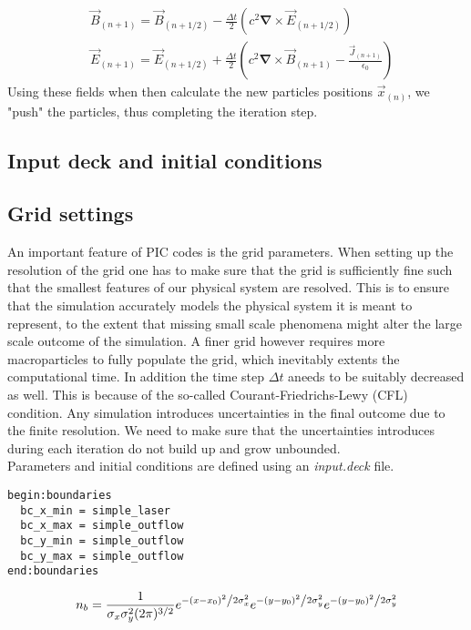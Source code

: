 \begin{align}
&\vec{B}_{(n+1)}=\vec{B}_{(n+1/2)}-\frac{\Delta t}{2}\left(c^2\mathbf{\nabla}\times \vec{E}_{(n+1/2)}\right)\\
&\vec{E}_{(n+1)}=\vec{E}_{(n+1/2)}+\frac{\Delta t}{2}\left(c^2\mathbf{\nabla}\times \vec{B}_{(n+1)}-\frac{\vec{J}_{(n+1)}}{\epsilon_0}\right)
\end{align}
Using these fields when then calculate the new particles positions $\vec{x}_{(n)}$, we "push" the particles, thus completing the iteration step.


\subsection{Input deck and initial conditions}

\subsection{Grid settings}
An important feature of PIC codes is the grid parameters. When setting up the resolution of the grid one has to make sure that the grid is sufficiently fine such that the smallest features of our physical system are resolved. This is to ensure that the simulation accurately models the physical system it is meant to represent, to the extent that missing small scale phenomena might alter the large scale outcome of the simulation. A finer grid however requires more macroparticles to fully populate the grid, which inevitably extents the computational time. In addition the time step $\Delta t$ aneeds to be suitably decreased as well. This is because of the so-called Courant-Friedrichs-Lewy (CFL) condition. 
Any simulation introduces uncertainties in the final outcome due to the finite resolution. We need to make sure that the uncertainties introduces during each iteration do not build up and grow unbounded. \\
\vfill
Parameters and initial conditions are defined using an \textit{input.deck} file.
\begin{verbatim}
begin:boundaries
  bc_x_min = simple_laser
  bc_x_max = simple_outflow
  bc_y_min = simple_outflow
  bc_y_max = simple_outflow
end:boundaries
\end{verbatim}
$$n_b = \frac{1}{{\sigma_x\sigma_y^2 (2\pi)^{3/2 }  }}e^{{{ - \left( {x - x_0 } \right)^2 } \mathord{\left/ {\vphantom {{ - \left( {x - x_0 } \right)^2 } {2\sigma_x ^2 }}} \right. \kern-\nulldelimiterspace} {2\sigma_x^2 }}}e^{{{ - \left( {y - y_0} \right)^2 } \mathord{\left/ {\vphantom {{ - \left( {y- y_0 } \right)^2 } {2\sigma_y ^2 }}} \right. \kern-\nulldelimiterspace} {2\sigma_y ^2 }}}e^{{{ - \left( {y - y_0 } \right)^2 } \mathord{\left/ {\vphantom {{ - \left( {y - y_0 } \right)^2 } {2\sigma ^2 }}} \right. \kern-\nulldelimiterspace} {2\sigma_y ^2 }}}$$
